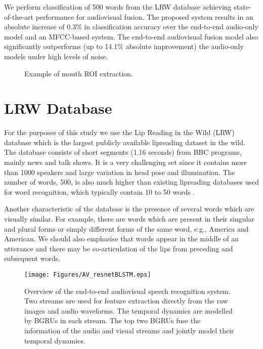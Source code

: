 \documentclass{article}
\begin{document}
We perform classification of 500 words from the LRW database achieving state-of-the-art performance for audiovisual fusion. The proposed system  results in an absolute increase of 0.3\% in classification accuracy over the end-to-end audio-only model and an MFCC-based system. The end-to-end audiovisual fusion model also significantly outperforms (up to 14.1\% absolute improvement) the audio-only models under high levels of noise.

\begin{figure}[t]


\begin{minipage}[t]{0.75\linewidth}
  \centering

\caption{Example of mouth ROI extraction.}
\label{fig:mouthROI}
\end{minipage}

\end{figure}


\section{LRW Database}
\label{sec:database}

For the purposes of this study we use the Lip Reading in the Wild (LRW) database \cite{chung2016lip} which is the largest publicly available lipreading dataset in the wild. The database consists of short segments (1.16 seconds) from BBC programs, mainly news and talk shows. It is a very challenging set since it contains more than 1000 speakers and large variation in head pose and illumination. The number of words, 500, is also much higher than existing lipreading databases used for word recognition, which typically contain 10 to 50 words \cite{cooke2006,Patterson:2002,Anina2015}. 

Another characteristic of the database is the presence of several words which are visually similar. For example, there are words which are present in their singular and plural forms or simply different forms of the same word, e.g., America and American. We should also emphasise that words appear in the middle of an utterance  and there may be co-articulation of the lips from preceding and subsequent words. 

\begin{figure}[t]


  \centering
\texttt{[image: Figures/AV\_resnetBLSTM.eps]}



\caption{Overview of the end-to-end audiovisual speech recognition system. Two streams are used for feature extraction directly from the raw images and audio waveforms.   The temporal dynamics are modelled by BGRUs in each stream. The top two BGRUs fuse the information of the audio and visual streams and jointly model their temporal dynamics. }
\label{fig:system}
\end{figure}
\end{document}
